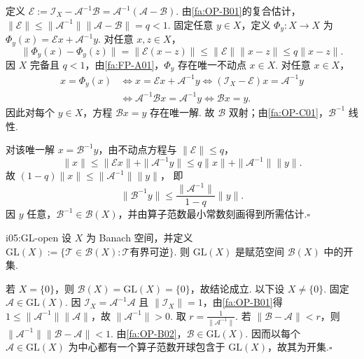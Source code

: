 \begin{FAProof}
定义 \(\displaystyle \mathcal E :=\mathcal I_X-\mathcal A^{-1}\mathcal B =\mathcal A^{-1}(\mathcal A-\mathcal B)\).
由\autoref{fa:OP-B01}的复合估计， \(\displaystyle \|\mathcal E\| \leqslant\|\mathcal A^{-1}\|\|\mathcal A-\mathcal B\| =q<1\).
固定任意 \(\displaystyle y\in X\)，定义 \(\displaystyle \Phi_y:X\to X\) 为 \(\displaystyle \Phi_y(x)=\mathcal E x+\mathcal A^{-1}y\).
对任意 \(\displaystyle x,z\in X\)，
\[
\|\Phi_y(x)-\Phi_y(z)\|
=\|\mathcal E(x-z)\|
\leqslant\|\mathcal E\|\|x-z\|
\leqslant q\|x-z\|.
\]
因 \(\displaystyle X\) 完备且 \(\displaystyle q<1\)，由\autoref{fa:FP-A01}，\(\displaystyle \Phi_y\) 存在唯一不动点 \(\displaystyle x\in X\). 对任意 \(\displaystyle x\in X\)，
\[
\begin{aligned}
x=\Phi_y(x)
&\iff x=\mathcal E x+\mathcal A^{-1}y\iff (\mathcal I_X-\mathcal E)x=\mathcal A^{-1}y\\
&\iff \mathcal A^{-1}\mathcal Bx=\mathcal A^{-1}y\iff \mathcal Bx=y.
\end{aligned}
\]
因此对每个 \(\displaystyle y\in X\)，方程 \(\displaystyle \mathcal Bx=y\) 存在唯一解. 故 \(\displaystyle \mathcal B\) 双射；由\autoref{fa:OP-C01}，\(\displaystyle \mathcal B^{-1}\) 线性.

对该唯一解 \(\displaystyle x=\mathcal B^{-1}y\)，由不动点方程与 \(\displaystyle \|\mathcal E\|\leqslant q\)，
\[
\|x\|
\leqslant\|\mathcal E x\|+\|\mathcal A^{-1}y\|
\leqslant q\|x\|+\|\mathcal A^{-1}\|\|y\|.
\]
故 \(\displaystyle (1-q)\|x\| \leqslant\|\mathcal A^{-1}\|\|y\|\)，
即
\[
\|\mathcal B^{-1}y\|
\leqslant
\frac{\|\mathcal A^{-1}\|}{1-q}\|y\|.
\]
因 \(\displaystyle y\) 任意，\(\displaystyle \mathcal B^{-1}\in\mathcal B(X)\)，并由算子范数最小常数刻画得到所需估计.\hfill\(\square\)
\end{FAProof}

\begin{FACorollary}[B][可逆算子集合是开集]{i05:GL-open}
设 \(\displaystyle X\) 为 Banach 空间，并定义 \(\displaystyle \mathrm{GL}(X) :=\{\mathcal T\in\mathcal B(X):\mathcal T\text{有界可逆}\}\).
则 \(\displaystyle \mathrm{GL}(X)\) 是赋范空间 \(\displaystyle \mathcal B(X)\) 中的开集.
\end{FACorollary}

\begin{FAProof}
若 \(\displaystyle X=\{0\}\)，则 \(\displaystyle \mathcal B(X)=\mathrm{GL}(X)=\{0\}\)，故结论成立. 以下设 \(\displaystyle X\neq\{0\}\). 固定 \(\displaystyle \mathcal A\in\mathrm{GL}(X)\). 因 \(\displaystyle \mathcal I_X=\mathcal A^{-1}\mathcal A\) 且 \(\displaystyle \|\mathcal I_X\|=1\)，由\autoref{fa:OP-B01}得 \(\displaystyle 1\leqslant\|\mathcal A^{-1}\|\|\mathcal A\|\)，故 \(\displaystyle \|\mathcal A^{-1}\|>0\). 取 \(\displaystyle r=\frac{1}{\|\mathcal A^{-1}\|}\). 若 \(\displaystyle \|\mathcal B-\mathcal A\|<r\)，则 \(\displaystyle \|\mathcal A^{-1}\|\|\mathcal B-\mathcal A\|<1\). 由\autoref{fa:OP-B02}，\(\displaystyle \mathcal B\in\mathrm{GL}(X)\). 因而以每个 \(\displaystyle \mathcal A\in\mathrm{GL}(X)\) 为中心都有一个算子范数开球包含于 \(\displaystyle \mathrm{GL}(X)\)，故其为开集.\hfill\(\square\)
\end{FAProof}

